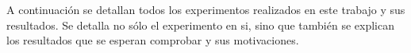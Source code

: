 \par A continuaci\'on se detallan todos los experimentos realizados en este
trabajo y sus resultados. Se detalla no s\'olo el experimento en si, sino que
tambi\'en se explican los resultados que se esperan comprobar y sus
motivaciones.

%

%


